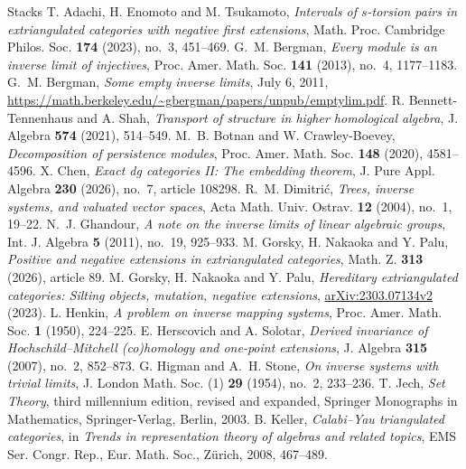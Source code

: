 \documentclass[a4paper,reqno,10pt]{amsart}
\numberwithin{equation}{section}
\theoremstyle{definition}
\begin{document}
\begin{thebibliography}{Stacks}
T. Adachi, H. Enomoto and M. Tsukamoto, \emph{Intervals of $s$-torsion
pairs in extriangulated categories with negative first extensions},
Math. Proc. Cambridge Philos. Soc. \textbf{174} (2023), no.~3, 451--469.
G.~M. Bergman, \emph{Every module is an inverse limit of injectives},
Proc. Amer. Math. Soc. \textbf{141} (2013), no.~4, 1177--1183.
G.~M. Bergman, \emph{Some empty inverse limits}, July 6, 2011,
\url{https://math.berkeley.edu/~gbergman/papers/unpub/emptylim.pdf}.
R. Bennett-Tennenhaus and A. Shah, \emph{Transport of structure in higher
homological algebra}, J. Algebra \textbf{574} (2021), 514--549.
M.~B. Botnan and W. Crawley-Boevey, \emph{Decomposition of persistence
modules}, Proc. Amer. Math. Soc. \textbf{148} (2020), 4581--4596.
X. Chen, \emph{Exact dg categories II: The embedding theorem},
J. Pure Appl. Algebra \textbf{230} (2026), no.~7, article 108298.
R.~M. Dimitri\'c, \emph{Trees, inverse systems, and valuated vector
spaces}, Acta Math. Univ. Ostrav. \textbf{12} (2004), no.~1, 19--22.
N.~J. Ghandour, \emph{A note on the inverse limits of linear algebraic
groups}, Int. J. Algebra \textbf{5} (2011), no.~19, 925--933.
M. Gorsky, H. Nakaoka and Y. Palu, \emph{Positive and negative extensions
in extriangulated categories}, Math. Z. \textbf{313} (2026), article 89.
M. Gorsky, H. Nakaoka and Y. Palu, \emph{Hereditary extriangulated
categories: Silting objects, mutation, negative extensions},
\href{https://arxiv.org/abs/2303.07134v2}{arXiv:2303.07134v2} (2023).
L. Henkin, \emph{A problem on inverse mapping systems},
Proc. Amer. Math. Soc. \textbf{1} (1950), 224--225.
E. Herscovich and A. Solotar, \emph{Derived invariance of
Hochschild--Mitchell (co)homology and one-point extensions},
J. Algebra \textbf{315} (2007), no.~2, 852--873.
G. Higman and A.~H. Stone, \emph{On inverse systems with trivial limits},
J. London Math. Soc. (1) \textbf{29} (1954), no.~2, 233--236.
T. Jech, \emph{Set Theory}, third millennium edition, revised and expanded,
Springer Monographs in Mathematics, Springer-Verlag, Berlin, 2003.
B. Keller, \emph{Calabi--Yau triangulated categories},
in \emph{Trends in representation theory of algebras and related topics},
EMS Ser. Congr. Rep., Eur. Math. Soc., Z\"urich, 2008, 467--489.

\end{thebibliography}
\end{document}
